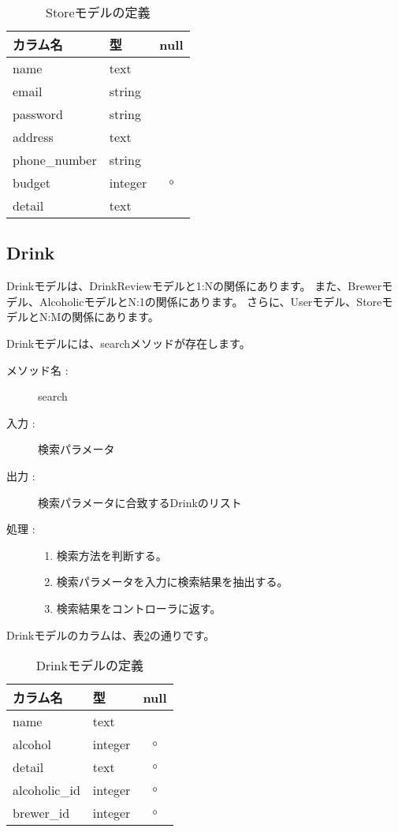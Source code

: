 \documentclass[a4j,titlepage]{jarticle}
\begin{document}
\begin{table}[!htbp]
\caption{Storeモデルの定義}
\label{store}
\small
\begin{center}
\begin{tabular}{|l|l|c|}\hline
カラム名 & 型 & null \\\hline\hline
name & text & \\\hline
email & string & \\\hline
password & string & \\\hline
address & text & \\\hline
phone\_number & string & \\\hline
budget & integer & $\circ$ \\\hline
detail & text & \\\hline
\end{tabular}
\end{center}
\end{table}

\subsection{Drink}
Drinkモデルは、DrinkReviewモデルと1:Nの関係にあります。
また、Brewerモデル、AlcoholicモデルとN:1の関係にあります。
さらに、Userモデル、StoreモデルとN:Mの関係にあります。

Drinkモデルには、searchメソッドが存在します。

\begin{description}
\item [メソッド名 :] search
\item [入力 :] 検索パラメータ
\item [出力 :] 検索パラメータに合致するDrinkのリスト
\item [処理 :]\mbox{}
  \begin{enumerate}
  \item 検索方法を判断する。
  \item 検索パラメータを入力に検索結果を抽出する。
  \item 検索結果をコントローラに返す。
  \end{enumerate}
\end{description}

Drinkモデルのカラムは、表\ref{drink}の通りです。

\begin{table}[!htbp]
\caption{Drinkモデルの定義}
\label{drink}
\small
\begin{center}
\begin{tabular}{|l|l|c|}\hline
カラム名 & 型 & null \\\hline\hline
name & text & \\\hline
alcohol & integer & $\circ$ \\\hline
detail & text & $\circ$ \\\hline
alcoholic\_id & integer & $\circ$ \\\hline
brewer\_id & integer & $\circ$ \\\hline
\end{tabular}
\end{center}
\end{table}
\end{document}
